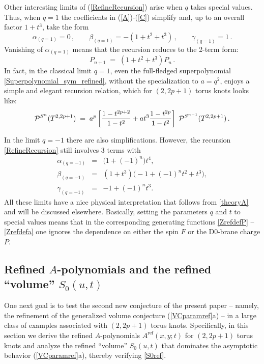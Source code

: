 \documentclass[hyper,letterpaper]{JHEP3}
\newcommand{\bea}{\begin{eqnarray}}
\newcommand{\eea}{\end{eqnarray}}
\newcommand{\be}{\begin{equation}}
\newcommand{\ee}{\end{equation}}
\renewcommand{\P}{{\cal P}}
\begin{document}
Other interesting limits of (\ref{RefineRecursion}) arise when $q$ takes special values.
Thus, when $\boxed{q=1}$ the coefficients in (\ref{A})-(\ref{C}) simplify and, up to an overall factor $1+t^3$, take the form
\be
\alpha_{(q=1)} = 0 \,,  \qquad   \beta_{(q=1)} = -(1+t^2+t^3) \,, \qquad  \gamma_{(q=1)} = 1 \,.
\ee
Vanishing of $\alpha_{(q=1)}$ means that the recursion reduces to the 2-term form:
\be
P_{n+1} \; = \; (1+t^2+t^3) P_n \,.
\ee
In fact, in the classical limit $q=1$, even the full-fledged superpolynomial \eqref{Superpolynomial_sym_refined},
without the specialization to $a=q^2$, enjoys a simple and elegant recursion relation, which for $(2,2p+1)$ torus knots looks like:
\be
\P^{S^n} (T^{2,2p+1})
\; = \; a^p \left[ \frac{1 - t^{2p+2}}{1 - t^2} + a t^3 \frac{1 - t^{2p}}{1 - t^2} \right]  \; \P^{S^{n-1}} (T^{2,2p+1})
\,.
\ee

In the limit $\boxed{q=-1}$ there are also simplifications.
However, the recursion \eqref{RefineRecursion} still involves 3 terms with
\bea
\alpha_{(q=-1)} & = & \big(1 + (-1)^n  \big)t^4,  \\
\beta_{(q=-1)} & = & (1+t^3)\big(-1+(-1)^nt^2 +t^3\big), \\
\gamma_{(q=-1)} & = & -1+(-1)^n t^3.
\eea
All these limits have a nice physical interpretation that follows from \eqref{theoryA}
and will be discussed elsewhere.
Basically, setting the parameters $q$ and $t$ to special values means that in the corresponding
generating functions \eqref{ZrefdefP} -- \eqref{Zrefdefa}
one ignores the dependence on either the spin $F$ or the D0-brane charge $P$.



\subsection{Refined $A$-polynomials and the refined ``volume'' $S_0 (u,t)$}
\label{sec:knotS0}

One next goal is to test the second new conjecture of the present paper -- namely,
the refinement of the generalized volume conjecture (\ref{VCparamref}a) --
in a large class of examples associated with $(2,2p+1)$ torus knots.
%
Specifically, in this section we derive the refined $A$-polynomials $A^{\text{ref}}(x,y;t)$
for $(2,2p+1)$ torus knots and analyze the refined ``volume'' $S_0 (u,t)$ that dominates
the asymptotic behavior (\ref{VCparamref}a), thereby verifying \eqref{S0ref}.
\end{document}
